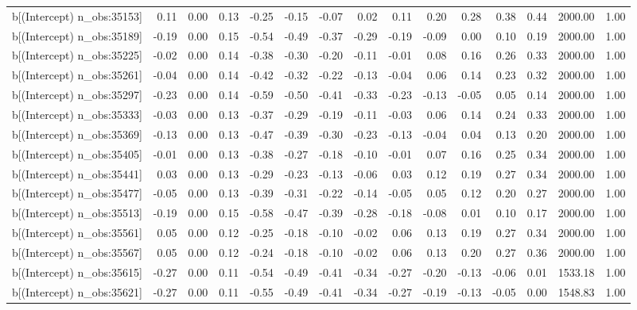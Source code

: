 \begin{table}[ht]
\begin{tabular}{rrrrrrrrrrrrrrr}
  b[(Intercept) n\_obs:35153] & 0.11 & 0.00 & 0.13 & -0.25 & -0.15 & -0.07 & 0.02 & 0.11 & 0.20 & 0.28 & 0.38 & 0.44 & 2000.00 & 1.00 \\ 
  b[(Intercept) n\_obs:35189] & -0.19 & 0.00 & 0.15 & -0.54 & -0.49 & -0.37 & -0.29 & -0.19 & -0.09 & 0.00 & 0.10 & 0.19 & 2000.00 & 1.00 \\ 
  b[(Intercept) n\_obs:35225] & -0.02 & 0.00 & 0.14 & -0.38 & -0.30 & -0.20 & -0.11 & -0.01 & 0.08 & 0.16 & 0.26 & 0.33 & 2000.00 & 1.00 \\ 
  b[(Intercept) n\_obs:35261] & -0.04 & 0.00 & 0.14 & -0.42 & -0.32 & -0.22 & -0.13 & -0.04 & 0.06 & 0.14 & 0.23 & 0.32 & 2000.00 & 1.00 \\ 
  b[(Intercept) n\_obs:35297] & -0.23 & 0.00 & 0.14 & -0.59 & -0.50 & -0.41 & -0.33 & -0.23 & -0.13 & -0.05 & 0.05 & 0.14 & 2000.00 & 1.00 \\ 
  b[(Intercept) n\_obs:35333] & -0.03 & 0.00 & 0.13 & -0.37 & -0.29 & -0.19 & -0.11 & -0.03 & 0.06 & 0.14 & 0.24 & 0.33 & 2000.00 & 1.00 \\ 
  b[(Intercept) n\_obs:35369] & -0.13 & 0.00 & 0.13 & -0.47 & -0.39 & -0.30 & -0.23 & -0.13 & -0.04 & 0.04 & 0.13 & 0.20 & 2000.00 & 1.00 \\ 
  b[(Intercept) n\_obs:35405] & -0.01 & 0.00 & 0.13 & -0.38 & -0.27 & -0.18 & -0.10 & -0.01 & 0.07 & 0.16 & 0.25 & 0.34 & 2000.00 & 1.00 \\ 
  b[(Intercept) n\_obs:35441] & 0.03 & 0.00 & 0.13 & -0.29 & -0.23 & -0.13 & -0.06 & 0.03 & 0.12 & 0.19 & 0.27 & 0.34 & 2000.00 & 1.00 \\ 
  b[(Intercept) n\_obs:35477] & -0.05 & 0.00 & 0.13 & -0.39 & -0.31 & -0.22 & -0.14 & -0.05 & 0.05 & 0.12 & 0.20 & 0.27 & 2000.00 & 1.00 \\ 
  b[(Intercept) n\_obs:35513] & -0.19 & 0.00 & 0.15 & -0.58 & -0.47 & -0.39 & -0.28 & -0.18 & -0.08 & 0.01 & 0.10 & 0.17 & 2000.00 & 1.00 \\ 
  b[(Intercept) n\_obs:35561] & 0.05 & 0.00 & 0.12 & -0.25 & -0.18 & -0.10 & -0.02 & 0.06 & 0.13 & 0.19 & 0.27 & 0.34 & 2000.00 & 1.00 \\ 
  b[(Intercept) n\_obs:35567] & 0.05 & 0.00 & 0.12 & -0.24 & -0.18 & -0.10 & -0.02 & 0.06 & 0.13 & 0.20 & 0.27 & 0.36 & 2000.00 & 1.00 \\ 
  b[(Intercept) n\_obs:35615] & -0.27 & 0.00 & 0.11 & -0.54 & -0.49 & -0.41 & -0.34 & -0.27 & -0.20 & -0.13 & -0.06 & 0.01 & 1533.18 & 1.00 \\ 
  b[(Intercept) n\_obs:35621] & -0.27 & 0.00 & 0.11 & -0.55 & -0.49 & -0.41 & -0.34 & -0.27 & -0.19 & -0.13 & -0.05 & 0.00 & 1548.83 & 1.00 \\ 

\end{tabular}
\end{table}
